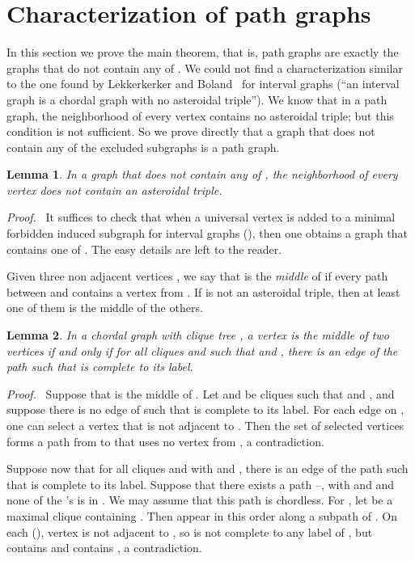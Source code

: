 \documentclass[11pt]{article}
\newtheorem{lemma}{Lemma}
\newenvironment{proof}{\noindent \emph{Proof.}\ }{\hfill
    \vspace{1em}}
\begin{document}
\section{Characterization of path graphs}

In this section we prove the main theorem, that is, path graphs are
exactly the graphs that do not contain any of .
We could not find a characterization similar to the one found by
Lekkerkerker and Boland~\cite{LB62} for interval graphs (``an interval
graph is a chordal graph with no asteroidal triple'').  We know that
in a path graph, the neighborhood of every vertex contains no
asteroidal triple; but this condition is not sufficient.  So we prove
directly that a graph that does not contain any of the excluded
subgraphs is a path graph.

\begin{lemma}
\label{lem:PAT}
In a graph that does not contain any of ,
the neighborhood of every vertex does not contain an asteroidal
triple.
\end{lemma}

\begin{proof}
    It suffices to check that when a universal vertex is added to a
    minimal forbidden induced subgraph for interval graphs
    (\cite{LB62}), then one obtains a graph that contains one of .  The easy details are left to the reader.
\end{proof}

Given three non adjacent vertices , we say that  is the
\emph{middle} of  if every path between  and  contains a
vertex from .  If  is not an asteroidal triple, then at
least one of them is the middle of the others.


\begin{lemma}
    \label{lem:middle}
In a chordal graph  with clique tree , a vertex  is the
middle of two vertices  if and only if for all cliques  and
 such that  and , there is an edge of the
path  such that  is complete to its label.
\end{lemma}

\begin{proof}
Suppose that  is the middle of .  Let  and  be
cliques such that  and , and suppose there is no
edge of  such that  is complete to its label.  For
each edge on , one can select a vertex that is not
adjacent to .  Then the set of selected vertices forms a path from
 to  that uses no vertex from , a contradiction.

Suppose now that for all cliques  and  with  and
, there is an edge of the path  such that 
is complete to its label.  Suppose that there exists a path
--, with  and  and none of the 's
is in .  We may assume that this path is chordless.  For , let  be a maximal clique containing .
Then  appear in this order along a subpath of .
On each  (), vertex  is not
adjacent to , so  is not complete to any label of , but  contains  and  contains , a
contradiction.
\end{proof}
\end{document}
